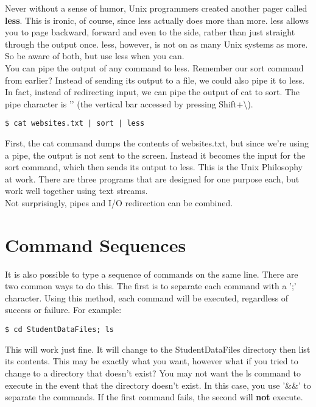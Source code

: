 Never without a sense of humor, Unix programmers created another pager called \textbf{less}.  This is ironic, of course, since less actually does more than more.  less allows you to page backward, forward and even to the side, rather than just straight through the output once.  less, however, is not on as many Unix systems as more.  So be aware of both, but use less when you can.\\

You can pipe the output of any command to less.  Remember our sort command from earlier?  Instead of sending its output to a file, we could also pipe it to less.  In fact, instead of redirecting input, we can pipe the output of cat to sort.  The pipe character is '\textbar' (the vertical bar accessed by pressing Shift+\textbackslash).

\begin{verbatim}
$ cat websites.txt | sort | less
\end{verbatim}

First, the cat command dumps the contents of websites.txt, but since we're using a pipe, the output is not sent to the screen.  Instead it becomes the input for the sort command, which then sends its output to less.  This is the Unix Philosophy at work.  There are three programs that are designed for one purpose each, but work well together using text streams.\\

Not surprisingly, pipes and I/O redirection can be combined.

\section{Command Sequences}

It is also possible to type a sequence of commands on the same line.  There are two common ways to do this.  The first is to separate each command with a ';' character.  Using this method, each command will be executed, regardless of success or failure.  For example:

\begin{verbatim}
$ cd StudentDataFiles; ls
\end{verbatim}

This will work just fine.  It will change to the StudentDataFiles directory then list its contents.  This may be exactly what you want, however what if you tried to change to a directory that doesn't exist?  You may not want the ls command to execute in the event that the directory doesn't exist.  In this case, you use '\&\&' to separate the commands.  If the first command fails, the second will \textbf{not} execute.

